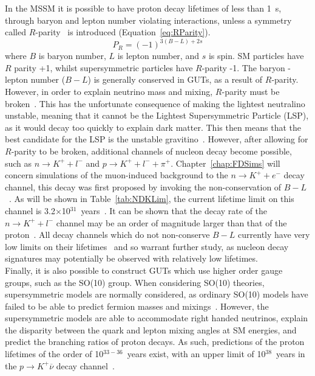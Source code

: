 In the MSSM it is possible to have proton decay lifetimes of less than 1~s, through baryon and lepton number violating interactions, unless a symmetry called $R$-parity~\citep{FARRAR1978575} is introduced (Equation~\ref{eq:RParity}).
\begin{equation}
  \label{eq:RParity}
  P_{R} = (-1)^{3(B-L)+2s}
\end{equation}
where $B$ is baryon number, $L$ is lepton number, and $s$ is spin. SM particles have $R$ parity +1, whilst supersymmetric particles have $R$-parity -1. The baryon - lepton number ($B-L$) is generally conserved in GUTs, as a result of $R$-parity. However, in order to explain neutrino mass and mixing, $R$-parity must be broken~\citep{Senjanovic:2009kr}. This has the unfortunate consequence of making the lightest neutralino unstable, meaning that it cannot be the Lightest Supersymmetric Particle (LSP), as it would decay too quickly to explain dark matter. This then means that the best candidate for the LSP is the unstable gravitino~\citep{Senjanovic:2009kr}. However, after allowing for $R$-parity to be broken, additional channels of nucleon decay become possible, such as $n \rightarrow K^{+} + l^{-}$ and $p \rightarrow K^{+} + l^{-} + \pi^{+}$. Chapter~\ref{chap:FDSims} will concern simulations of the muon-induced background to the $n \rightarrow K^{+} + e^{-}$ decay channel, this decay was first proposed by invoking the non-conservation of $B-L$~\citep{PATI1983330, PhysRevLett.44.1316}. As will be shown in Table~\ref{tab:NDKLim}, the current lifetime limit on this channel is 3.2$\times$10$^{31}$~years~\citep{berger:in2p3-00015565}. It can be shown that the decay rate of the $n \rightarrow K^{+} + l^{-}$ channel may be an order of magnitude larger than that of the proton~\citep{Senjanovic:2009kr, Vissani:1995hp}. All decay channels which do not non-conserve $B-L$ currently have very low limits on their lifetimes~\citep{PDGReview} and so warrant further study, as nucleon decay signatures may potentially be observed with relatively low lifetimes. \\

Finally, it is also possible to construct GUTs which use higher order gauge groups, such as the SO(10) group. When considering SO(10) theories, supersymmetric models are normally considered, as ordinary SO(10) models have failed to be able to predict fermion masses and mixings~\citep{Senjanovic:2009kr}. However, the supersymmetric models are able to accommodate right handed neutrinos, explain the disparity between the quark and lepton mixing angles at SM energies, and predict the branching ratios of proton decays. As such, predictions of the proton lifetimes of the order of 10$^{33-36}$~years exist, with an upper limit of 10$^{38}$~years in the $p \rightarrow K^{+} \overline{\nu}$ decay channel~\citep{Severson:2015dta}. \\

